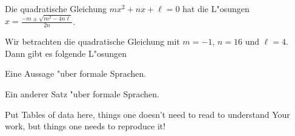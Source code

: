 \documentclass[twoside,a4paper,bsc]{master}
\begin{document}
\lipsum[5]


\lipsum[6]

\begin{Theorem}
Die quadratische Gleichung \(mx^{2}+nx+\ell=0\) hat die L"osungen
\(x=\frac{-m\pm\sqrt{m^{2}-4n\ell}}{2n}\).
\end{Theorem}

\lipsum[7]

\begin{Beispiel}
Wir betrachten die quadratische Gleichung mit \(m=-1\), \(n=16\) und \(\ell=4\).
Dann gibt es folgende L"osungen
\end{Beispiel}

\lipsum[8]

\begin{Lemma}[Parikh]
Eine Aussage "uber formale Sprachen.
\end{Lemma}

\lipsum[9]

\begin{Satz}
Ein anderer Satz "uber formale Sprachen.
\end{Satz}


\lipsum[10]


\lipsum[11]


\newpage
\small


\normalsize


\appendix
\noappendicestocpagenum
\addappheadtotoc


Put Tables of data here, things one doesn't need to read to understand Your
work, but things one needs to reproduce it!


\lipsum[9]

\Assertion
\end{document}
